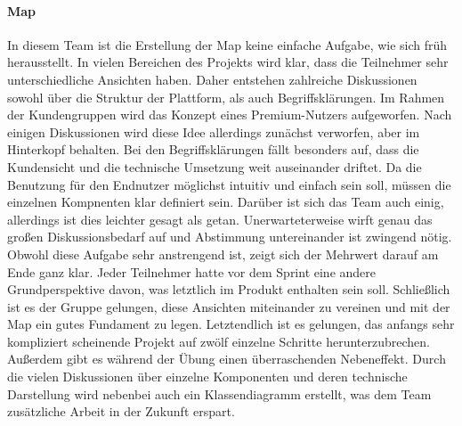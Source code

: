 \paragraph{Map}
In diesem Team ist die Erstellung der Map keine einfache Aufgabe, wie sich früh herausstellt. In vielen Bereichen des Projekts wird klar, dass die Teilnehmer sehr unterschiedliche Ansichten haben. Daher entstehen zahlreiche Diskussionen sowohl über die Struktur der Plattform, als auch Begriffsklärungen. Im Rahmen der Kundengruppen wird das Konzept eines Premium-Nutzers aufgeworfen. Nach einigen Diskussionen wird diese Idee allerdings zunächst verworfen, aber im Hinterkopf behalten. Bei den Begriffsklärungen fällt besonders auf, dass die Kundensicht und die technische Umsetzung weit auseinander driftet. Da die Benutzung für den Endnutzer möglichst intuitiv und einfach sein soll, müssen die einzelnen Kompnenten klar definiert sein. Darüber ist sich das Team auch einig, allerdings ist dies leichter gesagt als getan. Unerwarteterweise wirft genau das großen Diskussionsbedarf auf und Abstimmung untereinander ist zwingend nötig. Obwohl diese Aufgabe sehr anstrengend ist, zeigt sich der Mehrwert darauf am Ende ganz klar. Jeder Teilnehmer hatte vor dem Sprint eine andere Grundperspektive davon, was letztlich im Produkt enthalten sein soll. Schließlich ist es der Gruppe gelungen, diese Ansichten miteinander zu vereinen und mit der Map ein gutes Fundament zu legen. Letztendlich ist es gelungen, das anfangs sehr kompliziert scheinende Projekt auf zwölf einzelne Schritte herunterzubrechen. Außerdem gibt es während der Übung einen überraschenden Nebeneffekt. Durch die vielen Diskussionen über einzelne Komponenten und deren technische Darstellung wird nebenbei auch ein Klassendiagramm erstellt, was dem Team zusätzliche Arbeit in der Zukunft erspart.


